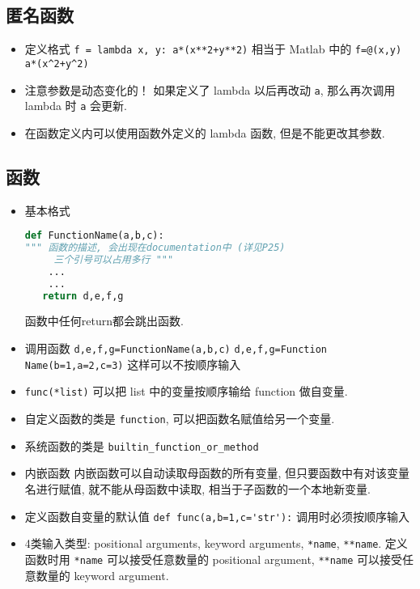 \subsection{匿名函数}
\begin{itemize}
\item 定义格式 \verb`f = lambda x, y: a*(x**2+y**2)` 相当于 Matlab 中的 \verb`f=@(x,y) a*(x^2+y^2)`
\item 注意参数是动态变化的！ 如果定义了 lambda 以后再改动 \verb`a`, 那么再次调用 lambda 时 \verb`a` 会更新.
\item 在函数定义内可以使用函数外定义的 lambda 函数, 但是不能更改其参数.
\end{itemize}

\subsection{函数}

\begin{itemize}
\item 基本格式
\begin{lstlisting}[language=python]
def FunctionName(a,b,c):
""" 函数的描述, 会出现在documentation中 (详见P25)
     三个引号可以占用多行 """
    ...
    ...
   return d,e,f,g
\end{lstlisting}

函数中任何return都会跳出函数.

\item 调用函数
\verb`d,e,f,g=FunctionName(a,b,c)`
\verb`d,e,f,g=Function Name(b=1,a=2,c=3)`  这样可以不按顺序输入
\item \verb`func(*list)` 可以把 list 中的变量按顺序输给 function 做自变量.

\item 自定义函数的类是 \verb`function`, 可以把函数名赋值给另一个变量.
\item 系统函数的类是 \verb`builtin_function_or_method`

\item 内嵌函数
内嵌函数可以自动读取母函数的所有变量, 但只要函数中有对该变量名进行赋值, 就不能从母函数中读取, 相当于子函数的一个本地新变量.

\item 定义函数自变量的默认值  \verb`def func(a,b=1,c='str'):` 调用时必须按顺序输入
\item 4类输入类型: positional arguments, keyword arguments, \verb`*name`, \verb`**name`. 定义函数时用 \verb`*name` 可以接受任意数量的 positional argument, \verb`**name` 可以接受任意数量的 keyword argument.
\end{itemize}


